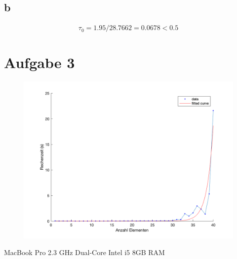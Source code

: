 \documentclass[12pt
,headinclude
,headsepline
,bibtotocnumbered
]{scrartcl}
\begin{document}
\subsection{b}
\begin{align*}
	\tau_0=1.95/28.7662=0.0678<0.5
\end{align*}
\section{Aufgabe 3}
\begin{figure}[H]
	\includegraphics[width=15cm]{figure}
\end{figure}
MacBook Pro 2.3 GHz Dual-Core Intel i5 8GB RAM
\end{document}
